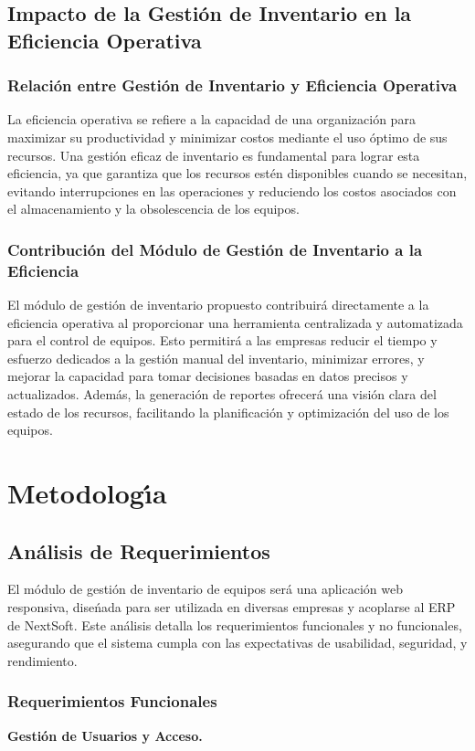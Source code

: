 \documentclass[stu, 12pt, letterpaper, donotrepeattitle, floatsintext, natbib]{apa7}
\begin{document}
\subsection{Impacto de la Gesti\'on de Inventario en la Eficiencia Operativa}
\subsubsection{Relaci\'on entre Gesti\'on de Inventario y Eficiencia Operativa}
La eficiencia operativa se refiere a la capacidad de una organizaci\'on para maximizar su productividad y minimizar costos mediante el uso \'optimo de sus recursos. Una gesti\'on eficaz de inventario es fundamental para lograr esta
eficiencia, ya que garantiza que los recursos est\'en disponibles cuando se necesitan, evitando interrupciones en las operaciones y reduciendo los costos asociados con el almacenamiento y la obsolescencia de los equipos.
\subsubsection{Contribuci\'on del M\'odulo de Gesti\'on de Inventario a la Eficiencia}
El m\'odulo de gesti\'on de inventario propuesto contribuir\'a directamente a la eficiencia operativa al proporcionar una herramienta centralizada y automatizada para el control de equipos. Esto permitir\'a a las empresas reducir el
tiempo y esfuerzo dedicados a la gesti\'on manual del inventario, minimizar errores, y mejorar la capacidad para tomar decisiones basadas en datos precisos y actualizados. Adem\'as, la generaci\'on de reportes ofrecer\'a
una visi\'on clara del estado de los recursos, facilitando la planificaci\'on y optimizaci\'on del uso de los equipos.
\newpage
\section{Metodolog\'{\i}a}
\subsection{An\'alisis de Requerimientos}
El m\'odulo de gesti\'on de inventario de equipos ser\'a una aplicaci\'on web responsiva, dise\'{n}ada para ser utilizada en diversas empresas y acoplarse al ERP de NextSoft. Este an\'alisis detalla los requerimientos funcionales y no funcionales,
asegurando que el sistema cumpla con las expectativas de usabilidad, seguridad, y rendimiento.
\subsubsection{Requerimientos Funcionales}
\textbf{Gesti\'on de Usuarios y Acceso.}
\end{document}
